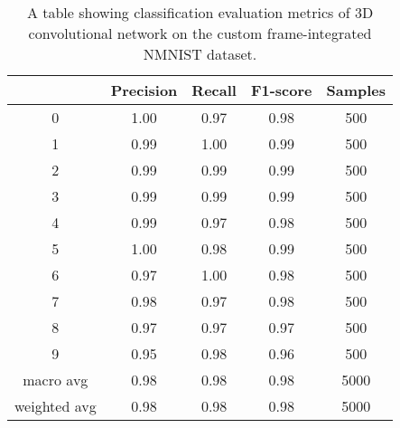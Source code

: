 \begin{table}[htb]
    \centering
    \begin{tabular}{|| c | c | c | c | c ||}
        \hline
             & Precision & Recall & F1-score & Samples \\
        \hline \hline
        0            & 1.00  & 0.97  & 0.98 & 500 \\
        \hline
        1            & 0.99  & 1.00  & 0.99 & 500 \\
        \hline
        2            & 0.99  & 0.99  & 0.99 & 500 \\
        \hline
        3            & 0.99  & 0.99  & 0.99 & 500 \\
        \hline
        4            & 0.99  & 0.97  & 0.98 & 500 \\
        \hline
        5            & 1.00  & 0.98  & 0.99 & 500 \\
        \hline
        6            & 0.97  & 1.00  & 0.98 & 500 \\
        \hline
        7            & 0.98  & 0.97  & 0.98 & 500 \\
        \hline
        8            & 0.97  & 0.97  & 0.97 & 500 \\
        \hline
        9            & 0.95  & 0.98  & 0.96 & 500 \\
        \hline
        macro avg    & 0.98  & 0.98  & 0.98 & 5000 \\
        \hline
        weighted avg & 0.98  & 0.98  & 0.98 & 5000 \\
        \hline
    \end{tabular}
    \caption{A table showing classification evaluation metrics of 3D convolutional network on the custom frame-integrated NMNIST dataset.}
    \label{tab:conv3d_nmnist_custom_frame_evaluation_metrics}
\end{table}

